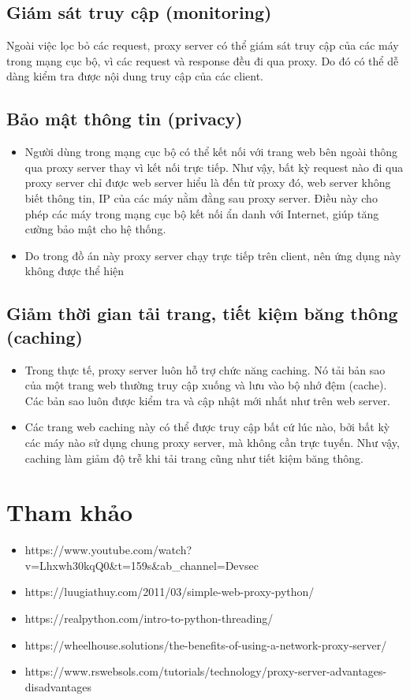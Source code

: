 \documentclass[12pt,a4paper]{article}
\begin{document}
		\subsection{Giám sát truy cập (monitoring)}
			Ngoài việc lọc bỏ các request, proxy server có thể giám sát truy cập của các máy trong mạng cục bộ, vì các request và response đều đi qua proxy. Do đó có thể dễ dàng kiểm tra được nội dung truy cập của các client.
		\subsection{Bảo mật thông tin (privacy)}
			\begin{itemize}
				\item Người dùng trong mạng cục bộ có thể kết nối với trang web bên ngoài thông qua proxy server thay vì kết nối trực tiếp. Như vậy, bất kỳ request nào đi qua proxy server chỉ được web server hiểu là đến từ proxy đó, web server không biết thông tin, IP của các máy nằm đằng sau proxy server. Điều này cho phép các máy trong mạng cục bộ kết nối ẩn danh với Internet, giúp tăng cường bảo mật cho hệ thống.
				\item Do trong đồ án này proxy server chạy trực tiếp trên client, nên ứng dụng này không được thể hiện
			\end{itemize}
		\subsection{Giảm thời gian tải trang, tiết kiệm băng thông (caching)}
			\begin{itemize}
				\item Trong thực tế, proxy server luôn hỗ trợ chức năng caching. Nó tải bản sao của một trang web thường truy cập xuống và lưu vào bộ nhớ đệm (cache). Các bản sao luôn được kiểm tra và cập nhật mới nhất như trên web server.
				\item Các trang web caching này có thể được truy cập bất cứ lúc nào, bởi bất kỳ các máy nào sử dụng chung proxy server, mà không cần trực tuyến. Như vậy, caching làm giảm độ trễ khi tải trang cũng như tiết kiệm băng thông.
			\end{itemize}
	\section{Tham khảo}
		\begin{itemize}
			\item https://www.youtube.com/watch?v=Lhxwh30kqQ0\&t=159s\&ab\_channel=Devsec
			\item https://luugiathuy.com/2011/03/simple-web-proxy-python/
			\item https://realpython.com/intro-to-python-threading/
			\item https://wheelhouse.solutions/the-benefits-of-using-a-network-proxy-server/
			\item https://www.rswebsols.com/tutorials/technology/proxy-server-advantages-disadvantages
		\end{itemize}
\end{document}
